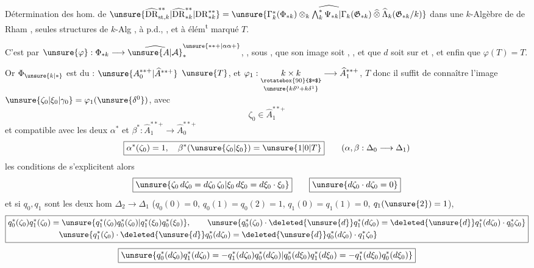 Détermination des hom.   de $\unsure{\widehat{\mathrm{DR}}_{\mathrm{st},k}^{**}|\widehat{\mathrm{DR}}_{*k}^{**}|\mathrm{DR}_{*k}^{**}}=
\widehat{\unsure{\Gamma_k^*(\Phi_{*k})\otimes_k\bigwedge_k^*\Psi_{*k}|\Gamma_k(\mathfrak G_{*k})\mathbin{\widehat\otimes}\widehat\Lambda_k(\mathfrak G_{*k}/k)}}$ dans une $k$-Algèbre de de Rham ,  seules structures de $k$-Alg , à p.d., , et à élém\textsuperscript{t} marqué $T$.

C'est  par $\unsure{\varphi}:\Phi_{*k}\longrightarrow\widehat{\unsure{A|\mathcal A}}_*^{\unsure{**+|\alpha\alpha+}}$, , sous  , que son image  soit , , et que $d$ soit  sur  et   , et enfin que $\varphi(T)=T$.

Or $\Phi_{\unsure{k|*}}$ est    du  :  $\unsure{A_0^{**+}|\widehat A^{**+}}$   $\unsure{T}$, et $\varphi_1:\underset{\unsure{k\delta^0+k\delta^1}}{\underset{\rotatebox{90}{$=$}}{k\times k}}\longrightarrow\widehat A_1^{**+}$,    $T$ donc il suffit de connaître l'image
$\unsure{\zeta_0|\xi_0|\gamma_0}=\varphi_1(\unsure{\delta^0})$, avec
\[
 \zeta_0\in\widehat A_1^{**+}
\]
et compatible avec les deux  $\alpha^*$ et $\beta^*:\widehat A_1^{**+}\longrightarrow\widehat A_0^{**+}$
\[
 \boxed{\alpha^*(\zeta_0)=1,\quad\beta^*(\unsure{\zeta_0|\xi_0})=\unsure{1|0|T}}\qquad
 (\alpha,\beta:\Delta_0\longrightarrow\Delta_1)
\]
les conditions de    s'explicitent alors 
\[
 \boxed{\unsure{\zeta_0\,d\zeta_0=d\zeta_0\,\zeta_0|\xi_0\,d\xi_0=d\xi_0\cdot\xi_0}}\qquad \boxed{\unsure{d\zeta_0\cdot d\zeta_0=0}}
\]
et si $q_0,q_1$ sont les deux hom  $\Delta_2\longrightarrow\Delta_1$ ($q_0(0)=0$, $q_0(1)=q_0(2)=1$, $q_1(0)=q_1(1)=0$, $q_1(\unsure{2})=1$), 
\[
 \boxed{\begin{aligned}
 q_0^*(\zeta_0)q_1^*(\zeta_0)&=\unsure{q_1^*(\zeta_0)q_0^*(\zeta_0)|q_1^*(\xi_0)q_0^*(\xi_0)},\qquad
 \unsure{q_0^*(\zeta_0)\cdot\deleted{\unsure{d}}q_1^*(d\zeta_0)=\deleted{\unsure{d}}q_1^*(d\zeta_0)\cdot q_0^*\zeta_0}\\
 &\hspace{1em}\unsure{q_1^*(\zeta_0)\cdot\deleted{\unsure{d}}q_0^*(d\zeta_0)=\deleted{\unsure{d}}q_0^*(d\zeta_0)\cdot q_1^*\zeta_0}
 \end{aligned}}
\]
\[
 \boxed{\unsure{q_0^*(d\zeta_0)q_1^*(d\zeta_0)=-q_1^*(d\zeta_0)q_0^*(d\zeta_0)|q_0^*(d\xi_0)q_1^*(d\xi_0)=-q_1^*(d\xi_0)q_0^*(d\xi_0)}}
\]

